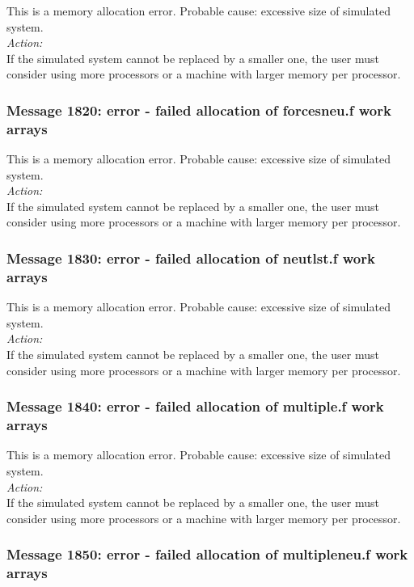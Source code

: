 This is a memory allocation error. Probable cause: excessive size of
simulated system. \\

\noindent
{\em Action:}\\
If the simulated system cannot be replaced by a smaller one, the user
must consider using more processors or a machine with larger memory
per processor.

\subsubsection*{Message 1820: error - failed allocation of forcesneu.f
work arrays}

This is a memory allocation error. Probable cause: excessive size of
simulated system. \\

\noindent
{\em Action:}\\
If the simulated system cannot be replaced by a smaller one, the user
must consider using more processors or a machine with larger memory
per processor.

\subsubsection*{Message 1830: error - failed allocation of neutlst.f
work arrays}

This is a memory allocation error. Probable cause: excessive size of
simulated system. \\

\noindent
{\em Action:}\\
If the simulated system cannot be replaced by a smaller one, the user
must consider using more processors or a machine with larger memory
per processor.

\subsubsection*{Message 1840: error - failed allocation of multiple.f
work arrays}

This is a memory allocation error. Probable cause: excessive size of
simulated system. \\

\noindent
{\em Action:}\\
If the simulated system cannot be replaced by a smaller one, the user
must consider using more processors or a machine with larger memory
per processor.

\subsubsection*{Message 1850: error - failed allocation of
multipleneu.f work arrays}

